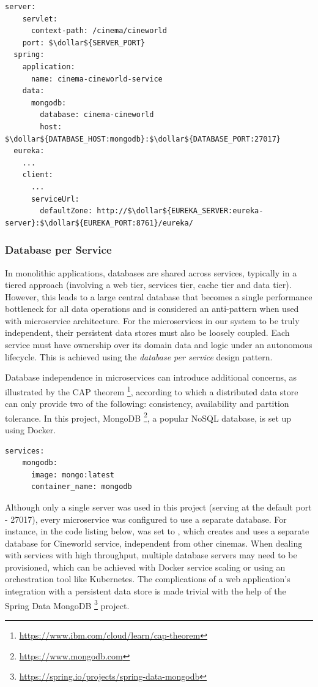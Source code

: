 \begin{lstlisting}[caption=Snippet from \code{cinema-cineworld-service} \code{application.yml} file.]
  server:
    servlet:
      context-path: /cinema/cineworld
    port: $\dollar${SERVER_PORT}
  spring:
    application:
      name: cinema-cineworld-service
    data:
      mongodb:
        database: cinema-cineworld
        host: $\dollar${DATABASE_HOST:mongodb}:$\dollar${DATABASE_PORT:27017}
  eureka:
    ...
    client:
      ...
      serviceUrl:
        defaultZone: http://$\dollar${EUREKA_SERVER:eureka-server}:$\dollar${EUREKA_PORT:8761}/eureka/
\end{lstlisting}

\subsubsection{Database per Service}

In monolithic applications, databases are shared across services, typically in a tiered approach (involving a web tier, services tier, cache tier and data tier). However, this leads to a large central database that becomes a single performance bottleneck for all data operations and is considered an anti-pattern when used with microservice architecture. For the microservices in our system to be truly independent, their persistent data stores must also be loosely coupled. Each service must have ownership over its domain data and logic under an autonomous lifecycle. This is achieved using the \textit{database per service} design pattern.

Database independence in microservices can introduce additional concerns, as illustrated by the CAP theorem \footnote{\url{https://www.ibm.com/cloud/learn/cap-theorem}}, according to which a distributed data store can only provide two of the following: consistency, availability and partition tolerance. In this project, MongoDB \footnote{\url{https://www.mongodb.com}}, a popular NoSQL database, is set up using Docker.

\begin{lstlisting}[caption=Docker Compose file snippet for MongoDB server.]
  services:
    mongodb:
      image: mongo:latest
      container_name: mongodb
\end{lstlisting}

Although only a single server was used in this project (serving at the default port - 27017), every microservice was configured to use a separate database. For instance, in the code listing below,  was set to , which creates and uses a separate database for Cineworld service, independent from other cinemas. When dealing with services with high throughput, multiple database servers may need to be provisioned, which can be achieved with Docker service scaling or using an orchestration tool like Kubernetes. The complications of a web application's integration with a persistent data store is made trivial with the help of the Spring Data MongoDB \footnote{\url{https://spring.io/projects/spring-data-mongodb}} project.

